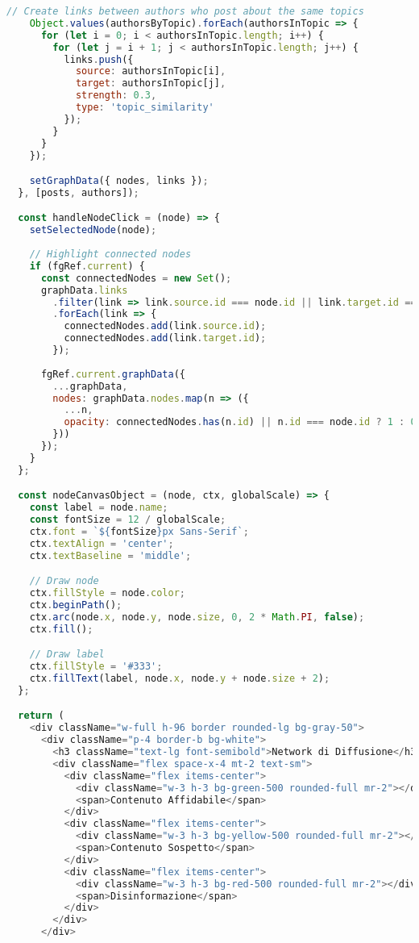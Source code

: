 \documentclass[12pt,a4paper]{report}
\begin{document}
\begin{lstlisting}[language=JavaScript, caption=ForceGraphDisplay.jsx]
    // Create links between authors who post about the same topics
    Object.values(authorsByTopic).forEach(authorsInTopic => {
      for (let i = 0; i < authorsInTopic.length; i++) {
        for (let j = i + 1; j < authorsInTopic.length; j++) {
          links.push({
            source: authorsInTopic[i],
            target: authorsInTopic[j],
            strength: 0.3,
            type: 'topic_similarity'
          });
        }
      }
    });

    setGraphData({ nodes, links });
  }, [posts, authors]);

  const handleNodeClick = (node) => {
    setSelectedNode(node);
    
    // Highlight connected nodes
    if (fgRef.current) {
      const connectedNodes = new Set();
      graphData.links
        .filter(link => link.source.id === node.id || link.target.id === node.id)
        .forEach(link => {
          connectedNodes.add(link.source.id);
          connectedNodes.add(link.target.id);
        });
      
      fgRef.current.graphData({
        ...graphData,
        nodes: graphData.nodes.map(n => ({
          ...n,
          opacity: connectedNodes.has(n.id) || n.id === node.id ? 1 : 0.3
        }))
      });
    }
  };

  const nodeCanvasObject = (node, ctx, globalScale) => {
    const label = node.name;
    const fontSize = 12 / globalScale;
    ctx.font = `${fontSize}px Sans-Serif`;
    ctx.textAlign = 'center';
    ctx.textBaseline = 'middle';

    // Draw node
    ctx.fillStyle = node.color;
    ctx.beginPath();
    ctx.arc(node.x, node.y, node.size, 0, 2 * Math.PI, false);
    ctx.fill();

    // Draw label
    ctx.fillStyle = '#333';
    ctx.fillText(label, node.x, node.y + node.size + 2);
  };

  return (
    <div className="w-full h-96 border rounded-lg bg-gray-50">
      <div className="p-4 border-b bg-white">
        <h3 className="text-lg font-semibold">Network di Diffusione</h3>
        <div className="flex space-x-4 mt-2 text-sm">
          <div className="flex items-center">
            <div className="w-3 h-3 bg-green-500 rounded-full mr-2"></div>
            <span>Contenuto Affidabile</span>
          </div>
          <div className="flex items-center">
            <div className="w-3 h-3 bg-yellow-500 rounded-full mr-2"></div>
            <span>Contenuto Sospetto</span>
          </div>
          <div className="flex items-center">
            <div className="w-3 h-3 bg-red-500 rounded-full mr-2"></div>
            <span>Disinformazione</span>
          </div>
        </div>
      </div>


\end{lstlisting}
\end{document}
